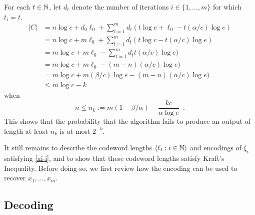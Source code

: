 \documentclass{patmorin}
\begin{document}

For each $t\in\mathbb{N}$, let $d_t$ denote the number of iterations $i\in\{1,\ldots,m\}$ for which $t_i=t$. 
\begin{align*}
    |C| 
    & = n\log c + d_0\ell_0 + \sum_{t=1}^m d_t\left(t\log c + \ell_0 - t(\alpha/c)\log e\right) 
      \\
    & = n\log c + m\ell_0 + \sum_{t=1}^m d_t\left(t\log c - t(\alpha/c)\log e\right) \\
    & = m\log c + m\ell_0 - \sum_{t=1}^m d_t t(\alpha/c)\log e) \\
    & = m\log c + m\ell_0 - (m-n)(\alpha/c)\log e) \\
    & = m\log c + m(\beta/c)\log e - (m-n)(\alpha/c)\log e) \\
    & \le m\log c - k
\end{align*}
when 
\[  n \le n_k := m(1-\beta/\alpha) - \frac{kc}{\alpha\log e} \enspace . \]
This shows that the probability that the algorithm fails to produce an output of length at least $n_k$ is at most $2^{-k}$.

It still remains to describe the codeword lengths $\langle \ell_t:i\in \mathbb{N}\rangle$ and encodings of $\xi_i$ satisfying \eqref{xi-i}, and to show that these codeword lengths satisfy Kraft's Inequality.  Before doing so, we first review how the encoding can be used to recover $x_1,\ldots,x_m$.


\subsection{Decoding}
\end{document}
